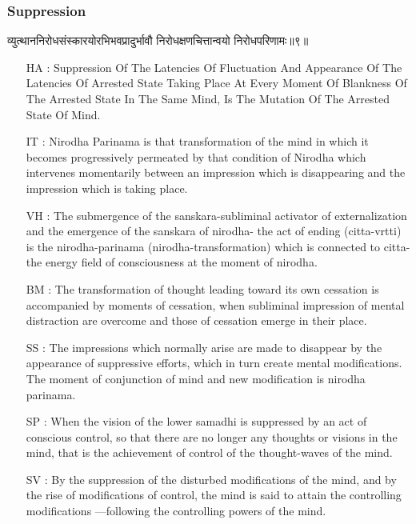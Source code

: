 \begin{frame}[fragile]\frametitle{Suppression}
\begin{sanskrit}
व्युत्थाननिरोधसंस्कारयोरभिभवप्रादुर्भावौ निरोधक्षणचित्तान्वयो निरोधपरिणामः॥९॥
\end{sanskrit}

	\begin{itemize}
	\item [HA]: Suppression Of The Latencies Of Fluctuation And Appearance Of The Latencies Of Arrested State Taking Place At Every Moment Of Blankness Of The Arrested State In The Same Mind, Is The Mutation Of The Arrested State Of Mind.
	\item [IT]: Nirodha Parinama is that transformation of the mind in which it becomes progressively permeated by that condition of Nirodha which intervenes momentarily between an impression which is disappearing and the impression which is taking place.
	\item [VH]: The submergence of the sanskara-subliminal activator of externalization and the emergence of the sanskara of nirodha- the act of ending (citta-vrtti) is the nirodha-parinama (nirodha-transformation) which is connected to citta- the energy field of consciousness at the moment of nirodha.
	\item [BM]: The transformation of thought leading toward its own cessation is accompanied by moments of cessation, when subliminal impression of mental distraction are overcome and those of cessation emerge in their place.
	\item [SS]: The impressions which normally arise are made to disappear by the appearance of suppressive efforts, which in turn create mental modifications. The moment of conjunction of mind and new modification is nirodha parinama.
	\item [SP]: When the vision of the lower samadhi is suppressed by an act of conscious control, so that there are no longer any thoughts or visions in the mind, that is the achievement of control of the thought-waves of the mind.
	\item [SV]: By the suppression of the disturbed modifications of the mind, and by the rise of modifications of control, the mind is said to attain the controlling modifications —following the controlling powers of the mind. 
	\end{itemize}
\end{frame}

